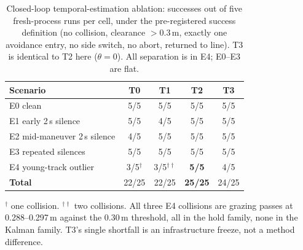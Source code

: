 \begin{table}[t]
\centering
\caption{Closed-loop temporal-estimation ablation: successes out of five
fresh-process runs per cell, under the pre-registered success definition
(no collision, clearance $>0.3$\,m, exactly one avoidance entry, no side
switch, no abort, returned to line). T3 is identical to T2 here ($\theta=0$).
All separation is in E4; E0--E3 are flat.}
\label{tab:phase7b}
\footnotesize
\setlength{\tabcolsep}{4pt}
\renewcommand{\arraystretch}{1.15}
\begin{tabular}{@{}p{34mm} c c c c@{}}
\toprule
\textbf{Scenario} & \textbf{T0} & \textbf{T1} & \textbf{T2} & \textbf{T3} \\
\midrule
E0 clean                        & 5/5 & 5/5 & 5/5 & 5/5 \\
E1 early 2\,s silence           & 5/5 & 4/5 & 5/5 & 5/5 \\
E2 mid-maneuver 2\,s silence    & 4/5 & 5/5 & 5/5 & 5/5 \\
E3 repeated silences            & 5/5 & 5/5 & 5/5 & 5/5 \\
E4 young-track outlier          & 3/5$^{\dagger}$ & 3/5$^{\dagger\dagger}$ & \textbf{5/5} & 4/5 \\
\midrule
\textbf{Total}                  & 22/25 & 22/25 & \textbf{25/25} & 24/25 \\
\bottomrule
\end{tabular}
\vspace{0.5mm}
\raggedright\scriptsize
$^{\dagger}$ one collision. $^{\dagger\dagger}$ two collisions. All three E4
collisions are grazing passes at 0.288--0.297\,m against the 0.30\,m
threshold, all in the hold family, none in the Kalman family. T3's single
shortfall is an infrastructure freeze, not a method difference.
\end{table}
